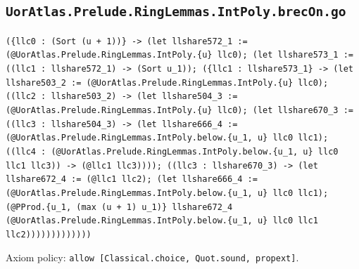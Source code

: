 \documentclass[11pt]{article}
\begin{document}
\subsection*{\texttt{UorAtlas.Prelude.RingLemmas.IntPoly.brecOn.go}}
\noindent\texttt{(\{llc0 : (Sort (u + 1))\} -> (let llshare572\_1 := (@UorAtlas.Prelude.RingLemmas.IntPoly.\{u\} llc0); (let llshare573\_1 := ((llc1 : llshare572\_1) -> (Sort u\_1)); (\{llc1 : llshare573\_1\} -> (let llshare503\_2 := (@UorAtlas.Prelude.RingLemmas.IntPoly.\{u\} llc0); ((llc2 : llshare503\_2) -> (let llshare504\_3 := (@UorAtlas.Prelude.RingLemmas.IntPoly.\{u\} llc0); (let llshare670\_3 := ((llc3 : llshare504\_3) -> (let llshare666\_4 := (@UorAtlas.Prelude.RingLemmas.IntPoly.below.\{u\_1, u\} llc0 llc1); ((llc4 : (@UorAtlas.Prelude.RingLemmas.IntPoly.below.\{u\_1, u\} llc0 llc1 llc3)) -> (@llc1 llc3)))); ((llc3 : llshare670\_3) -> (let llshare672\_4 := (@llc1 llc2); (let llshare666\_4 := (@UorAtlas.Prelude.RingLemmas.IntPoly.below.\{u\_1, u\} llc0 llc1); (@PProd.\{u\_1, (max (u + 1) u\_1)\} llshare672\_4 (@UorAtlas.Prelude.RingLemmas.IntPoly.below.\{u\_1, u\} llc0 llc1 llc2)))))))))))))}\par
\noindent Axiom policy: \texttt{allow [Classical.choice, Quot.sound, propext]}.\par
\end{document}
